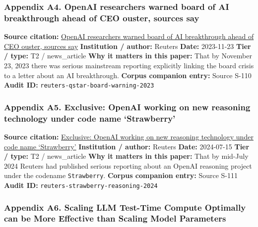 \documentclass[
  american,
  11pt,
  letterpaper,
]{article}
\begin{document}
\subsubsection{Appendix A4. OpenAI researchers warned board of AI
breakthrough ahead of CEO ouster, sources
say}\label{appendix-a4-openai-researchers-warned-board-of-ai-breakthrough-ahead-of-ceo-ouster-sources-say}

\textbf{Source citation:}
\href{https://www.reuters.com/technology/sam-altmans-ouster-openai-was-precipitated-by-letter-board-about-ai-breakthrough-2023-11-22/}{OpenAI
researchers warned board of AI breakthrough ahead of CEO ouster, sources
say} \textbf{Institution / author:} Reuters \textbf{Date:} 2023-11-23
\textbf{Tier / type:} T2 / news\_article \textbf{Why it matters in this
paper:} That by November 23, 2023 there was serious mainstream reporting
explicitly linking the board crisis to a letter about an AI
breakthrough. \textbf{Corpus companion entry:} Source S-110
\textbf{Audit ID:} \texttt{reuters-qstar-board-warning-2023}

\subsubsection{Appendix A5. Exclusive: OpenAI working on new reasoning
technology under code name
`Strawberry'}\label{appendix-a5-exclusive-openai-working-on-new-reasoning-technology-under-code-name-strawberry}

\textbf{Source citation:}
\href{https://www.reuters.com/technology/artificial-intelligence/openai-working-new-reasoning-technology-under-code-name-strawberry-2024-07-12/}{Exclusive:
OpenAI working on new reasoning technology under code name `Strawberry'}
\textbf{Institution / author:} Reuters \textbf{Date:} 2024-07-15
\textbf{Tier / type:} T2 / news\_article \textbf{Why it matters in this
paper:} That by mid-July 2024 Reuters had published serious reporting
about an OpenAI reasoning project under the codename
\texttt{Strawberry}. \textbf{Corpus companion entry:} Source S-111
\textbf{Audit ID:} \texttt{reuters-strawberry-reasoning-2024}

\subsubsection{Appendix A6. Scaling LLM Test-Time Compute Optimally can
be More Effective than Scaling Model
Parameters}\label{appendix-a6-scaling-llm-test-time-compute-optimally-can-be-more-effective-than-scaling-model-parameters}
\end{document}
